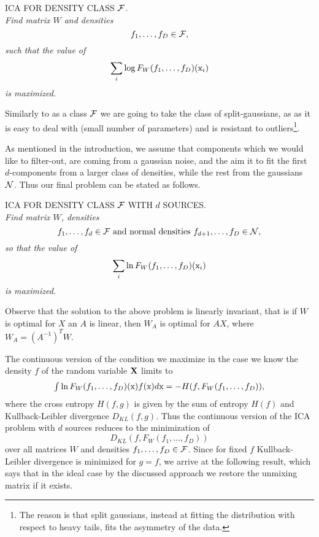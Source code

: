 \medskip

\noindent ICA FOR DENSITY CLASS $\mathcal{F}$.\\ {\em Find matrix $W$ and
densities
$$
f_1,\ldots,f_D \in \mathcal{F}, 
$$
such that the value of 
$$
\sum_i \log F_W(f_1,\ldots,f_D)(\mathrm{x}_i)
$$
is maximized.
}

\medskip

Similarly to \cite{ICA2017pattern} as a class $\mathcal{F}$ we are going to
take the class of split-gaussians, as 
as it is easy to deal with (small number of parameters) and is resistant to outliers\footnote{The reason is that split gaussians, instead at fitting the distribution with respect to heavy tails, fits the asymmetry of the data.}.

As mentioned in the introduction, we assume that components which we would like to filter-out, are coming from a gaussian noise, and the aim it to fit the first $d$-components from a larger class of densities, while the rest from the gaussians $\mathcal{N}$. Thus our final problem can be stated as follows.

\medskip

\noindent ICA FOR DENSITY CLASS $\mathcal{F}$ WITH $d$ SOURCES. \\{\em Find matrix $W$, densities 
$$
f_1,\ldots,f_d \in \mathcal{F} \text{ and normal densities } f_{d+1},\ldots,f_D \in \mathcal{N},
$$
so that the value of 
$$
\sum_i \ln F_W(f_1,\ldots,f_D)(\mathrm{x}_i)
$$
is maximized.
}

\medskip

Observe that the solution to the above problem is linearly invariant, that is if
$W$ is optimal for $X$ an $A$ is linear, then $W_A$ is optimal for $AX$,
where $W_A=(A^{-1})^TW$.

The continuous version of the condition we maximize in the case we know the density $f$
of the random variable $\mathbf{X}$ limits to
$$
\begin{array}{l}
\int \ln F_W(f_1,\ldots,f_D)(\x)f(\x) d\x %
=-H(f,F_W(f_1,\ldots,f_D)),
\end{array}
$$
where the cross entropy $H(f,g)$ is given by the sum of entropy $H(f)$
and Kullback-Leibler divergence $D_{KL}(f,g)$. Thus the continuous version of the ICA problem
with $d$ sources reduces to the minimization of 
$$
D_{KL}(f,F_W(f_1,\ldots,f_D))
$$
over all matrices $W$ and densities $f_1,\ldots,f_D \in \mathcal{F}$. Since for fixed $f$ Kullback-Leibler divergence is minimized for $g=f$, we arrive at the following result, which says that in the ideal case 
by the discussed approach we restore the unmixing matrix if it exists.

